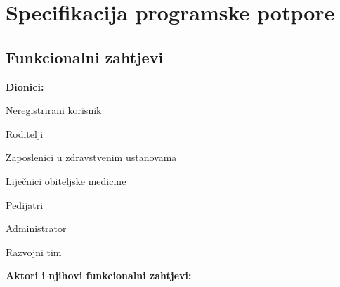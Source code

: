 \chapter{Specifikacija programske potpore}
		
	\section{Funkcionalni zahtjevi}
					
			\noindent \textbf{Dionici:}
			
			\begin{packed_enum}
				
				\item Neregistrirani korisnik
				\item Roditelji
				\item Zaposlenici u zdravstvenim ustanovama
					\begin{packed_enum}
						\item Liječnici obiteljske medicine
						\item Pedijatri
					\end{packed_enum}				
				\item Administrator
				\item Razvojni tim
				
			\end{packed_enum}
			
			\noindent \textbf{Aktori i njihovi funkcionalni zahtjevi:}
			

